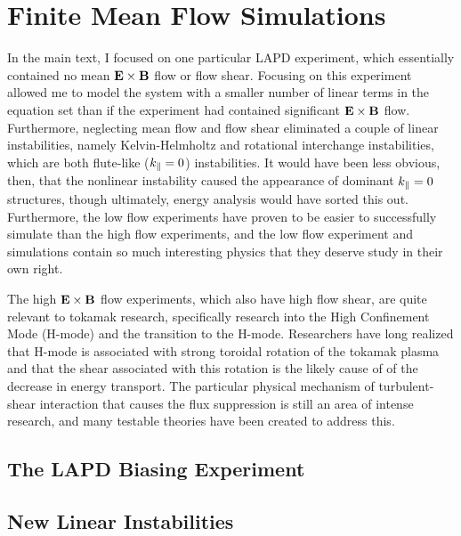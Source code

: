 \chapter{Finite Mean Flow Simulations}
\label{app_mean_flow}

In the main text, I focused on one particular LAPD experiment, which essentially contained no mean ${\bf E \times B}$ flow or flow shear. Focusing on this experiment
allowed me to model the system with a smaller number of linear terms in the equation set than if the experiment had contained significant ${\bf E \times B}$ flow. 
Furthermore, neglecting mean flow and flow shear eliminated a couple of linear instabilities, namely Kelvin-Helmholtz
and rotational interchange instabilities, which are both flute-like ($k_{\parallel} = 0$) instabilities. It would have been less obvious, then, that the nonlinear instability caused the appearance
of dominant $k_{\parallel} = 0$ structures, though ultimately, energy analysis would have sorted this out. Furthermore, the low flow experiments have proven to be easier to successfully simulate than
the high flow experiments, and the low flow experiment and simulations contain so much interesting physics that they deserve study in their own right.

The high ${\bf E \times B}$ flow experiments, which also have high flow shear, are quite relevant to tokamak research, specifically research into the High Confinement Mode (H-mode)
and the transition to the H-mode. Researchers have long realized that H-mode is associated with strong toroidal rotation of the tokamak plasma and that the shear associated with this rotation
is the likely cause of of the decrease in energy transport. The particular physical mechanism of turbulent-shear interaction that causes the flux suppression is still an area of intense
research, and many testable theories have been created to address this.


\section{The LAPD Biasing Experiment}
\label{s_biasing_exp}

\section{New Linear Instabilities}
\label{s_flow_inst}

